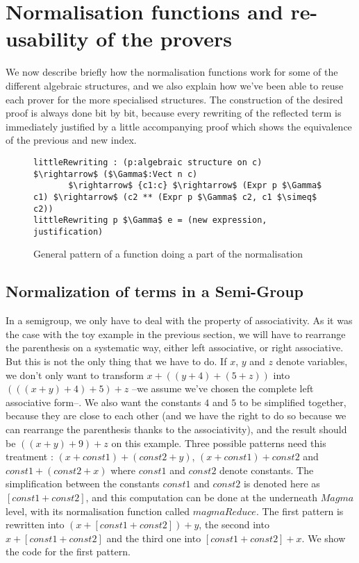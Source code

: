 \section {Normalisation functions and re-usability of the provers}

We now describe briefly how the normalisation functions work for some of the different algebraic structures, and we also explain how we've been able to reuse each prover for the more specialised structures. The construction of the desired proof is always done bit by bit, because every rewriting of the reflected term is immediately justified by a little accompanying proof which shows the equivalence of the previous and new index.
\begin{figure}[H]
\figrule
\begin{center}
\begin{lstlisting}
littleRewriting : (p:algebraic structure on c) $\rightarrow$ ($\Gamma$:Vect n c) 
       $\rightarrow$ {c1:c} $\rightarrow$ (Expr p $\Gamma$ c1) $\rightarrow$ (c2 ** (Expr p $\Gamma$ c2, c1 $\simeq$ c2))
littleRewriting p $\Gamma$ e = (new expression, justification)
\end{lstlisting}
\end{center}
\caption{General pattern of a function doing a part of the normalisation}
\figrule
\end{figure}

	\subsection {Normalization of terms in a Semi-Group}
In a semigroup, we only have to deal with the property of associativity. As it was the case with the toy example in the previous section, we will have to rearrange the parenthesis on a systematic way, either left associative, or right associative. But this is not the only thing that we have to do. If $x$, $y$ and $z$ denote variables, we don't only want to transform $x+((y+4)+(5+z))$ into $(((x+y)+4)+5)+z$ --we assume we've chosen the complete left associative form--. We also want the constants $4$ and $5$ to be simplified together, because they are close to each other (and we have the right to do so because we can rearrange the parenthesis thanks to the associativity), and the result should be $((x+y)+9)+z$ on this example. Three possible patterns need this treatment : $(x+const1)+(const2+y)$, $(x + const1) + const2$  and $const1 + (const2 + x)$ where $const1$ and $const2$ denote constants. The simplification between the constants $const1$ and $const2$ is denoted here as $[const1+const2]$, and this computation can be done at the underneath $Magma$ level, with its normalisation function called $magmaReduce$.
The first pattern is rewritten into $(x + [const1+const2]) + y$, the second into $x + [const1+const2]$ and the third one into $[const1 + const2] + x$.
We show the code for the first pattern.

